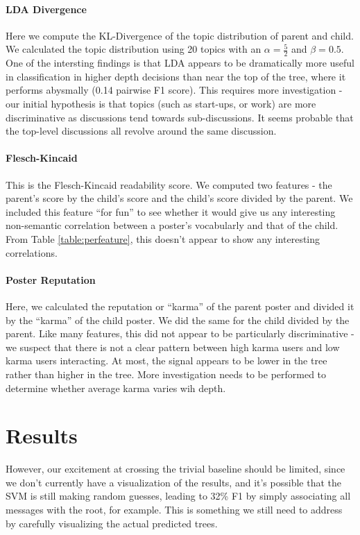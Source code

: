 \documentclass{article}
\begin{document}
\paragraph{LDA Divergence} Here we compute the KL-Divergence of the topic distribution
of parent and child. We calculated the topic distribution using 20 topics with
an $\alpha=\frac{5}{2}$ and $\beta = 0.5$. One of the intersting findings is
that LDA appears to be dramatically more useful in classification in higher
depth decisions than near the top of the tree, where it performs abysmally (0.14
pairwise F1 score). This requires more investigation - our initial hypothesis is
that topics (such as start-ups, or work) are more discriminative as discussions
tend towards sub-discussions. It seems probable that the top-level discussions
all revolve around the same discussion.

\paragraph{Flesch-Kincaid} This is the Flesch-Kincaid readability score. We computed
two features - the parent's score by the child's score and the child's score divided
by the parent. We included this feature ``for fun'' to see whether it would give
us any interesting non-semantic correlation between a poster's vocabularly and
that of the child. From Table \ref{table:perfeature}, this doesn't appear to
show any interesting correlations.

\paragraph{Poster Reputation} Here, we calculated the reputation or ``karma'' of the
parent poster and divided it by the ``karma'' of the child poster. We did the same
for the child divided by the parent. Like many features, this did not appear to
be particularly discriminative - we suspect that there is not a clear pattern
between high karma users and low karma users interacting. At most, the signal
appears to be lower in the tree rather than higher in the tree. More
investigation needs to be performed to determine whether average karma varies
wih depth.


\section{Results}
\label{sec:results}
However, our excitement at crossing the trivial baseline should be limited,
since we don't currently have a visualization of the results, and it's
possible that the SVM is still making random guesses, leading to 32\% F1 by
simply associating all messages with the root, for example. This is something
we still need to address by carefully visualizing the actual predicted trees.
\end{document}
